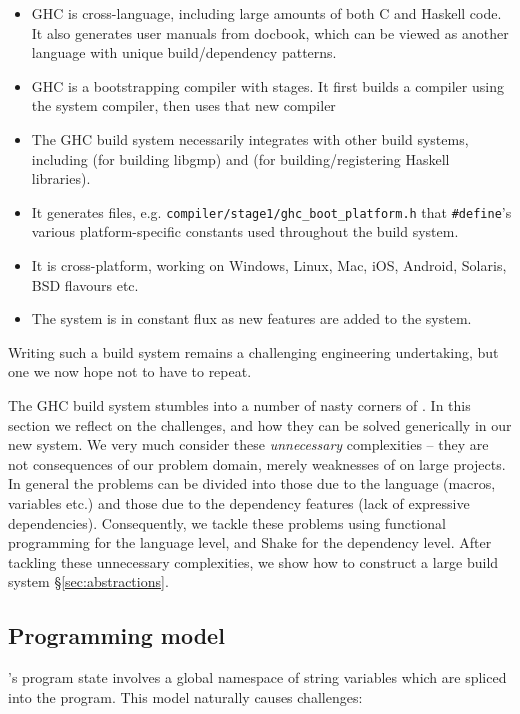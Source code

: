 \begin{itemize}
\item GHC is cross-language, including large amounts of both C and Haskell code.
It also generates user manuals from docbook, which can be viewed as another
language with unique build/dependency patterns.
\item GHC is a bootstrapping compiler with stages. It first builds a compiler
using the system compiler, then uses that new compiler
\item The GHC build system necessarily integrates with other build systems,
including \make{} (for building libgmp) and \cabal{} (for building/registering
Haskell libraries).
\item It generates files, e.g. \texttt{compiler/stage1/ghc\_boot\_platform.h}
that \texttt{\#define}'s various platform-specific constants used throughout the
build system.
\item It is cross-platform, working on Windows, Linux, Mac, iOS, Android,
Solaris, BSD flavours etc.
\item The system is in constant flux as new features are added to the system.
\end{itemize}

Writing such a build system remains a challenging engineering undertaking, but
one we now hope not to have to repeat.

The GHC build system stumbles into a number of nasty corners of \make{}. In this section we reflect on the challenges, and how they can be solved generically in our new system. We very much consider these \textit{unnecessary} complexities -- they are not consequences of our problem domain, merely weaknesses of \make{} on large projects. In general the problems can be divided into those due to the \make{} language (macros, variables etc.) and those due to the \make{} dependency features (lack of expressive dependencies). Consequently, we tackle these problems using functional programming for the language level, and Shake for the dependency level. After tackling these unnecessary complexities, we show how to construct a large build system \S\ref{sec:abstractions}.

\subsection{Programming model}

\make{}'s program state involves a global namespace of string variables which are spliced into the program. This model naturally causes challenges:

